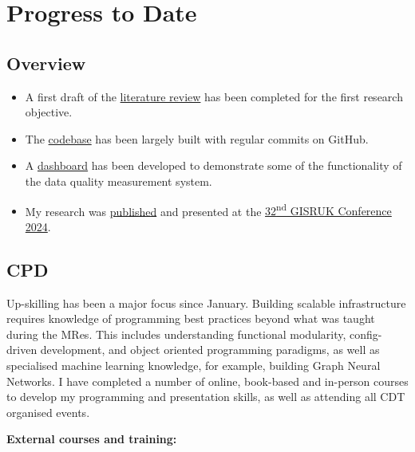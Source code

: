 \section{Progress to Date}

\subsection{Overview}
\begin{itemize}
    \item A first draft of the \href{https://carrowmw.github.io/latex-documents/}{literature review} has been completed for the first research objective.
    \item The \href{https://github.com/carrowmw/phd-project}{codebase} has been largely built with regular commits on GitHub.
    \item A \href{}{dashboard} has been developed to demonstrate some of the functionality of the data quality measurement system.
    \item My research was \href{https://zenodo.org/records/10931950}{published} and presented at the \href{https://2024.gisruk.org/}{32\textsuperscript{nd} GISRUK Conference 2024}.
\end{itemize}

\subsection{CPD}
Up-skilling has been a major focus since January. Building scalable infrastructure requires knowledge of programming best practices beyond what was taught during the MRes. This includes understanding functional modularity, config-driven development, and object oriented programming paradigms, as well as specialised machine learning knowledge, for example, building Graph Neural Networks. I have completed a number of online, book-based and in-person courses to develop my programming and presentation skills, as well as attending all CDT organised events.

\textbf{External courses and training:}

